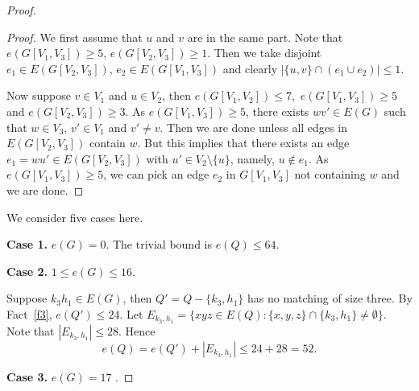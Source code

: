 \documentclass[11pt, reqno]{amsart}    	%
\theoremstyle{definition}
\numberwithin{equation}{section}
\begin{document}
\begin{proof}
\begin{proof}
			
			We first assume that $u$ and $v$ are in the same part. Note that $e(G[V_{1},V_{3}])\ge5$, $e(G[V_{2},V_{3}])\ge1$. Then we take disjoint $ e_1\in E(G[V_{2},V_{3}])$, $e_2\in E(G[V_{1},V_{3}])$ and clearly $|\{u,v\}\cap( e_1\cup e_2)|\le1$. 
			
			Now suppose $v\in V_1$ and $u\in V_2$, then $e(G[V_{1},V_{2}])\le7,$ $e(G[V_{1},V_{3}])\ge5$ and $e(G[V_{2},V_{3}])\ge3$.  
			As $e(G[V_{1},V_{3}])\ge5$, there exists $wv'\in  E(G)$ such that $w\in V_3$, $v'\in V_1$ and $v'\neq v$.
			Then we are done unless all edges in $ E(G[V_{2},V_{3}]) $ contain $w$. 
			But this implies that there exists an edge $e_1=wu'\in  E(G[V_{2},V_{3}])$ with $u'\in V_2\setminus \{u\}$, namely, $u\notin e_1$.
			As $e(G[V_{1},V_{3}])\ge5$, we can pick an edge $e_2$ in $G[V_{1},V_{3}]$ not containing $w$ and we are done.
		\end{proof}	
		
		We consider five cases here.
		
		\textbf{Case 1.} $ e(G)=0 $. The trivial bound is $ e(Q)\le 64 $.
		
		\textbf{Case 2.} $ 1\le e(G)\le16$. 
		
		Suppose $ k_3h_1\in E(G) $, then $Q'=Q-\{k_3,h_1\}$ has no matching of size  three. By Fact~\ref{f3},  $e(Q')\le24.$ Let $ E_{k_3,h_1} =\{xyz\in E(Q):\{x,y,z\}\cap\{k_3,h_1\}\not= \emptyset\}$.
		Note that $ |E_{k_3,h_1}|\le28. $ Hence
		\[
		e(Q)= e(Q')+|E_{k_3,h_1}|\le 24+28=52.
		\]
		
		
		\textbf{Case 3.} $  e(G)=17$ .
		

\end{proof}
\end{document}
